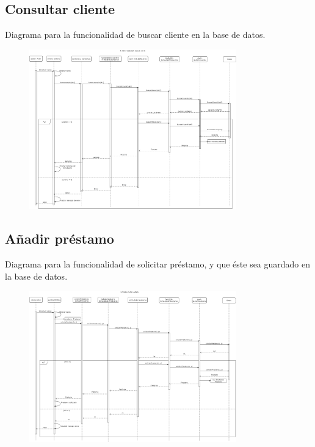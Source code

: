 \documentclass[12pt]{article}
\begin{document}
\subsection{Consultar cliente}
Diagrama para la funcionalidad de buscar cliente en la base de datos.
\begin{figure}[H]
    \centering
    \includegraphics[width=0.8\textwidth]{images/gestor_selecciona_cliente_consultar_5.png}
\end{figure}
\subsection{Añadir préstamo}
Diagrama para la funcionalidad de solicitar préstamo, y que éste sea guardado en la base de datos.
\begin{figure}[H]
    \centering
    \includegraphics[width=0.8\textwidth]{images/ClienteSolicitaPrestamo2.png}
\end{figure}
\end{document}
